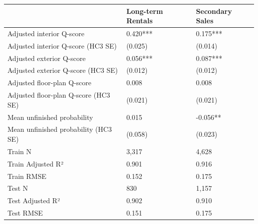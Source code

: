 \begin{tabular}{lll}
\toprule
 & Long-term Rentals & Secondary Sales \\
\midrule
Adjusted interior Q-score & 0.420*** & 0.175*** \\
Adjusted interior Q-score (HC3 SE) & (0.025) & (0.014) \\
Adjusted exterior Q-score & 0.056*** & 0.087*** \\
Adjusted exterior Q-score (HC3 SE) & (0.012) & (0.012) \\
Adjusted floor-plan Q-score & 0.008 & 0.008 \\
Adjusted floor-plan Q-score (HC3 SE) & (0.021) & (0.021) \\
Mean unfinished probability & 0.015 & -0.056** \\
Mean unfinished probability (HC3 SE) & (0.058) & (0.023) \\
Train N & 3,317 & 4,628 \\
Train Adjusted R² & 0.901 & 0.916 \\
Train RMSE & 0.152 & 0.175 \\
Test N & 830 & 1,157 \\
Test Adjusted R² & 0.902 & 0.910 \\
Test RMSE & 0.151 & 0.175 \\
\bottomrule
\end{tabular}
